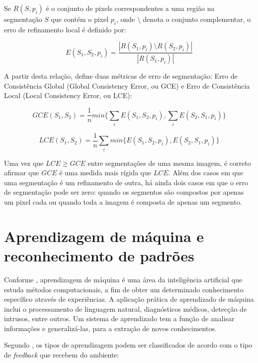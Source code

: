 Se $R(S,p_i)$ é o conjunto de pixels correspondentes a uma região na segmentação $S$ que contém o pixel $p_i$, onde $\setminus$ denota o conjunto complementar, o erro de refinamento local é definido por:

\begin{equation}
	\displaystyle E(S_1,S_2,p_i) = \frac{|R(S_1,p_i) \setminus R(S_2,p_i)|}{|R(S_1,p_i)|}
\end{equation}


A partir desta relação,  define duas métricas de erro de segmentação: Erro de Consistência Global (Global Consistency Error, ou GCE) e Erro de Consistência Local (Local Consistency Error, ou LCE):

\begin{equation}
	\displaystyle GCE(S_1,S_2) = \frac{1}{n} min \biggl\{ \sum_{i} E(S_1,S_2,p_i), \sum_{i} E(S_2,S_1,p_i) \biggr\}
\end{equation}

\begin{equation}
	\displaystyle LCE(S_1,S_2) = \frac{1}{n} \sum_{i} min \biggl\{ E(S_1,S_2,p_i), E(S_2,S_1,p_i) \biggr\}
\end{equation}

Uma vez que $LCE \geq GCE$ entre segmentações de uma mesma imagem, é correto afirmar que $GCE$ é uma medida mais rígida que $LCE$. Além dos casos em que uma segmentação é um refinamento de outra, há ainda dois casos em que o erro de segmentação pode ser zero: quando os segmentos são compostos por apenas um pixel cada ou quando toda a imagem é composta de apenas um segmento.

\section{Aprendizagem de máquina e reconhecimento de padrões}

Conforme , aprendizagem de máquina é uma área da inteligência artificial que estuda métodos computacionais, a fim de obter um determinado conhecimento específico através de experiências. A aplicação prática de aprendizado de máquina inclui o processamento de linguagem natural, diagnósticos médicos, detecção de intrusos, entre outros. Um sistema de aprendizado tem a função de analisar informações e generalizá-las, para a extração de novos conhecimentos.

Segundo , os tipos de aprendizagem podem ser classificados de acordo com o tipo de \textit{feedback} que recebem do ambiente:

